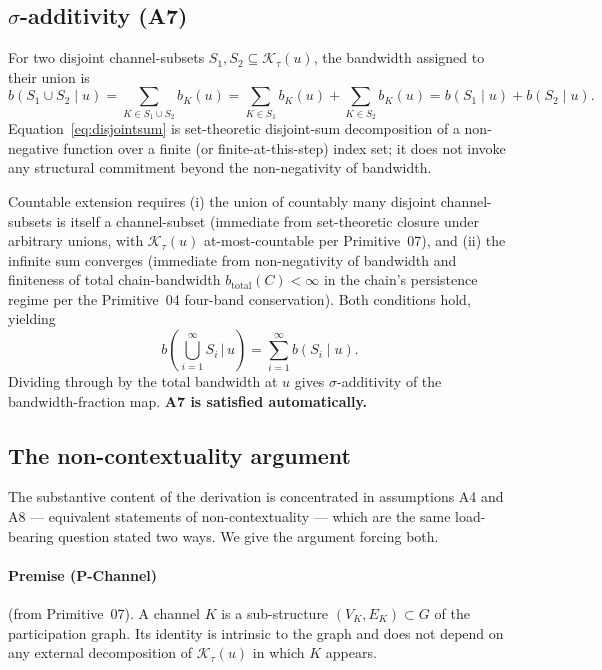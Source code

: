 \documentclass[11pt,a4paper]{article}
\begin{document}
\subsection{$\sigma$-additivity (A7)}

For two disjoint channel-subsets $S_1, S_2 \subseteq \mathcal{K}_\tau(u)$, the bandwidth assigned to their union is
\begin{equation}
b(S_1 \cup S_2 \mid u) = \sum_{K \in S_1 \cup S_2} b_K(u) = \sum_{K \in S_1} b_K(u) + \sum_{K \in S_2} b_K(u) = b(S_1 \mid u) + b(S_2 \mid u).
\label{eq:disjointsum}
\end{equation}
Equation~\eqref{eq:disjointsum} is set-theoretic disjoint-sum decomposition of a non-negative function over a finite (or finite-at-this-step) index set; it does not invoke any structural commitment beyond the non-negativity of bandwidth.

Countable extension requires (i) the union of countably many disjoint channel-subsets is itself a channel-subset (immediate from set-theoretic closure under arbitrary unions, with $\mathcal{K}_\tau(u)$ at-most-countable per Primitive~07), and (ii) the infinite sum converges (immediate from non-negativity of bandwidth and finiteness of total chain-bandwidth $b_\mathrm{total}(C) < \infty$ in the chain's persistence regime per the Primitive~04 four-band conservation). Both conditions hold, yielding
\begin{equation}
b\!\left(\bigcup_{i=1}^\infty S_i \,\Big|\, u\right) = \sum_{i=1}^\infty b(S_i \mid u).
\label{eq:countable}
\end{equation}
Dividing through by the total bandwidth at $u$ gives $\sigma$-additivity of the bandwidth-fraction map. \textbf{A7 is satisfied automatically.}

\subsection{The non-contextuality argument}\label{subsec:noncontext}

The substantive content of the derivation is concentrated in assumptions A4 and A8 --- equivalent statements of non-contextuality --- which are the same load-bearing question stated two ways. We give the argument forcing both.

\paragraph{Premise (P-Channel)} (from Primitive~07). A channel $K$ is a sub-structure $(V_K, E_K) \subset G$ of the participation graph. Its identity is intrinsic to the graph and does not depend on any external decomposition of $\mathcal{K}_\tau(u)$ in which $K$ appears.
\end{document}

